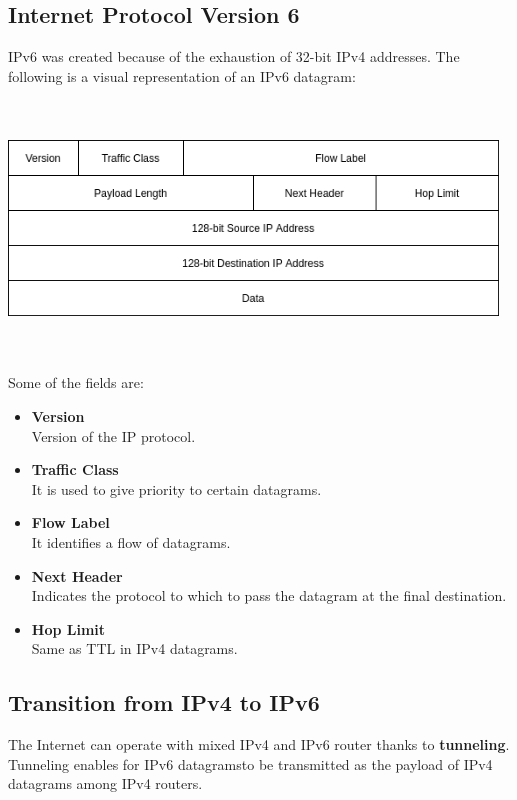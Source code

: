 \documentclass{article}
\begin{document}
\subsection{Internet Protocol Version 6}
IPv6 was created because of the exhaustion of 32-bit IPv4 addresses. The following is a visual representation of an IPv6 datagram: \\ \\ \\
\centerline{\includegraphics[width=13cm]{./assets/ipv6_datagram.png}} \\ \\ 
Some of the fields are:

\begin{itemize}
	\item \textbf{Version}
	\vspace{.2cm} \\
	Version of the IP protocol.
	
	\item \textbf{Traffic Class}
	\vspace{.2cm} \\
	It is used to give priority to certain datagrams.
	
	\item \textbf{Flow Label}
	\vspace{.2cm} \\
	It identifies a flow of datagrams.
	
	\item \textbf{Next Header}
	\vspace{.2cm} \\
	Indicates the protocol to which to pass the datagram at the final destination.
	
	\item \textbf{Hop Limit}
	\vspace{.2cm} \\
	Same as TTL in IPv4 datagrams.
\end{itemize}

\subsection{Transition from IPv4 to IPv6}
The Internet can operate with mixed IPv4 and IPv6 router thanks to \textbf{tunneling}. Tunneling enables for IPv6 datagramsto be transmitted as the payload of IPv4 datagrams among IPv4 routers.
\end{document}
